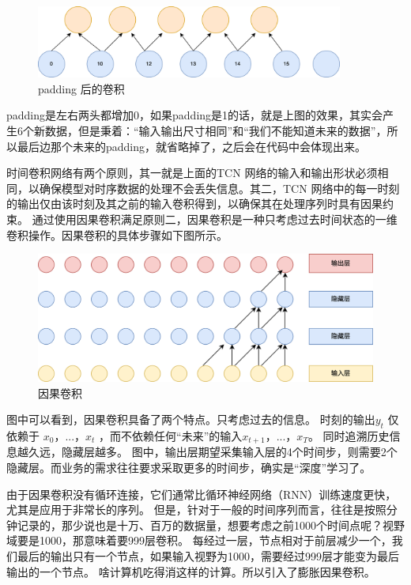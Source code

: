 \begin{figure}[htbp]
  \centering
  \includegraphics[width=0.9\textwidth]{figures/convolution_2.png}
  \caption{padding 后的卷积}
\end{figure}

padding是左右两头都增加0，如果padding是1的话，就是上图的效果，其实会产生6个新数据，但是秉着：“输入输出尺寸相同”和“我们不能知道未来的数据”，所以最后边那个未来的padding，就省略掉了，之后会在代码中会体现出来。

时间卷积网络有两个原则，其一就是上面的TCN 网络的输入和输出形状必须相同，以确保模型对时序数据的处理不会丢失信息。其二，TCN 网络中的每一时刻的输出仅由该时刻及其之前的输入卷积得到，以确保其在处理序列时具有因果约束。
通过使用因果卷积满足原则二，因果卷积是一种只考虑过去时间状态的一维卷积操作。因果卷积的具体步骤如下图所示。

\begin{figure}[htbp]
  \centering
  \includegraphics[width=\textwidth]{figures/causal_convolution.png}
  \caption{因果卷积}
\end{figure}

图中可以看到，因果卷积具备了两个特点。只考虑过去的信息。 时刻的输出$y_t$ 仅依赖于 $x_0，...，x_t$ ，而不依赖任何“未来”的输入$x_{t+1}，...，x_T$。
同时追溯历史信息越久远，隐藏层越多。 图中，输出层期望采集输入层的4个时间步，则需要2个隐藏层。而业务的需求往往要求采取更多的时间步，确实是“深度”学习了。

由于因果卷积没有循环连接，它们通常比循环神经网络（RNN）训练速度更快，尤其是应用于非常长的序列。
但是，针对于一般的时间序列而言，往往是按照分钟记录的，那少说也是十万、百万的数据量，想要考虑之前1000个时间点呢？视野域要是1000，那意味着要999层卷积。
每经过一层，节点相对于前层减少一个，我们最后的输出只有一个节点，如果输入视野为1000，需要经过999层才能变为最后输出的一个节点。
啥计算机吃得消这样的计算。所以引入了膨胀因果卷积。

